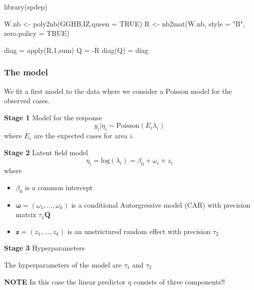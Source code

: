 \documentclass[
  letterpaper,
  DIV=11,
  numbers=noendperiod]{scrartcl}
\newenvironment{Shaded}{\begin{snugshade}}{\end{snugshade}}
\newcommand{\AttributeTok}[1]{\textcolor[rgb]{0.40,0.45,0.13}{#1}}
\newcommand{\ConstantTok}[1]{\textcolor[rgb]{0.56,0.35,0.01}{#1}}
\newcommand{\DecValTok}[1]{\textcolor[rgb]{0.68,0.00,0.00}{#1}}
\newcommand{\FunctionTok}[1]{\textcolor[rgb]{0.28,0.35,0.67}{#1}}
\newcommand{\NormalTok}[1]{\textcolor[rgb]{0.00,0.23,0.31}{#1}}
\newcommand{\OtherTok}[1]{\textcolor[rgb]{0.00,0.23,0.31}{#1}}
\newcommand{\SpecialCharTok}[1]{\textcolor[rgb]{0.37,0.37,0.37}{#1}}
\newcommand{\StringTok}[1]{\textcolor[rgb]{0.13,0.47,0.30}{#1}}
\providecommand{\tightlist}{%
  \setlength{\itemsep}{0pt}\setlength{\parskip}{0pt}}\usepackage{longtable,booktabs,array}
\begin{document}
\begin{Shaded}
\begin{Highlighting}[]
\FunctionTok{library}\NormalTok{(spdep)}

\NormalTok{W.nb }\OtherTok{\textless{}{-}} \FunctionTok{poly2nb}\NormalTok{(GGHB.IZ,}\AttributeTok{queen =} \ConstantTok{TRUE}\NormalTok{)}
\NormalTok{R }\OtherTok{\textless{}{-}} \FunctionTok{nb2mat}\NormalTok{(W.nb, }\AttributeTok{style =} \StringTok{"B"}\NormalTok{, }\AttributeTok{zero.policy =} \ConstantTok{TRUE}\NormalTok{)}

\NormalTok{diag }\OtherTok{=} \FunctionTok{apply}\NormalTok{(R,}\DecValTok{1}\NormalTok{,sum)}
\NormalTok{Q }\OtherTok{=} \SpecialCharTok{{-}}\NormalTok{R}
\FunctionTok{diag}\NormalTok{(Q) }\OtherTok{=}\NormalTok{ diag}
\end{Highlighting}
\end{Shaded}

\subsubsection{The model}\label{the-model}

We fit a first model to the data where we consider a Poisson model for
the observed cases.

\textbf{Stage 1} Model for the response \[
y_i|\eta_i\sim\text{Poisson}(E_i\lambda_i)
\] where \(E_i\) are the expected cases for area \(i\).

\textbf{Stage 2} Latent field model \[
\eta_i = \text{log}(\lambda_i) = \beta_0 + \omega_i + z_i
\] where

\begin{itemize}
\tightlist
\item
  \(\beta_0\) is a common intercept
\item
  \(\mathbf{\omega} = (\omega_1, \dots, \omega_k)\) is a conditional
  Autorgressive model (CAR) with precision matrix \(\tau_1\mathbf{Q}\)
\item
  \(\mathbf{z} = (z_1, \dots, z_k)\) is an unstrictured random effect
  with precision \(\tau_2\)
\end{itemize}

\textbf{Stage 3} Hyperparameters

The hyperparameters of the model are \(\tau_1\) and \(\tau_2\)

\textbf{NOTE} In this case the linear predictor \(\eta\) consists of
three components!!
\end{document}

